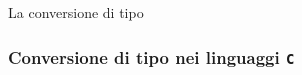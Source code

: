 \documentclass[xcolor={dvipsnames, svgnames, x11names, table}, 10pt]{beamer}
\begin{document}
\begin{frame}{La conversione di tipo}




\end{frame}

\subsubsection{Conversione di tipo nei linguaggi \texttt{C}}
\end{document}
